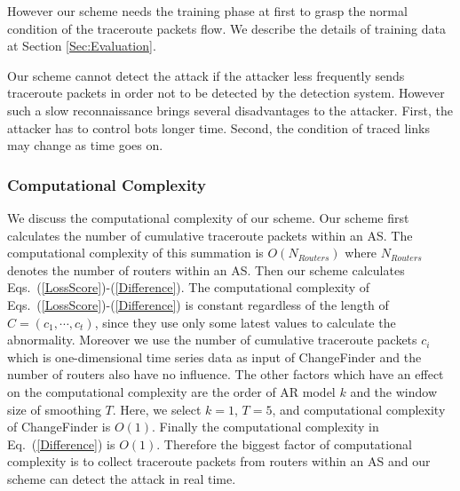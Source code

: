 \documentclass[conference]{IEEEtran}
\begin{document}
    However our scheme needs the training phase at first to grasp the normal condition of the traceroute packets flow.
    We describe the details of training data at Section \ref{Sec:Evaluation}.

    Our scheme cannot detect the attack if the attacker less frequently sends traceroute packets in order not to be detected by the detection system.
    However such a slow reconnaissance brings several disadvantages to the attacker.
    First, the attacker has to control bots longer time.
    Second, the condition of traced links may change as time goes on.

  \subsubsection{Computational Complexity}
    We discuss the computational complexity of our scheme.
    Our scheme first calculates the number of cumulative traceroute packets within an AS.
    The computational complexity of this summation is $O(N_{Routers})$ where $N_{Routers}$ denotes the number of routers within an AS.
    Then our scheme calculates Eqs.~(\ref{LossScore})-(\ref{Difference}).
    The computational complexity of Eqs.~(\ref{LossScore})-(\ref{Difference}) is constant regardless of the length of $C = (c_1, \cdots, c_t)$, since they use only some latest values to calculate the abnormality.
    Moreover we use the number of cumulative traceroute packets $c_i$ which is one-dimensional time series data as input of ChangeFinder and the number of routers also have no influence.
    The other factors which have an effect on the computational complexity are the order of AR model $k$ and the window size of smoothing $T$.
    Here, we select $k=1$, $T=5$, and computational complexity of ChangeFinder is $O(1)$.
    Finally the computational complexity in Eq.~(\ref{Difference}) is $O(1)$.
    Therefore the biggest factor of computational complexity is to collect traceroute packets from routers within an AS and our scheme can detect the attack in real time.
\end{document}
